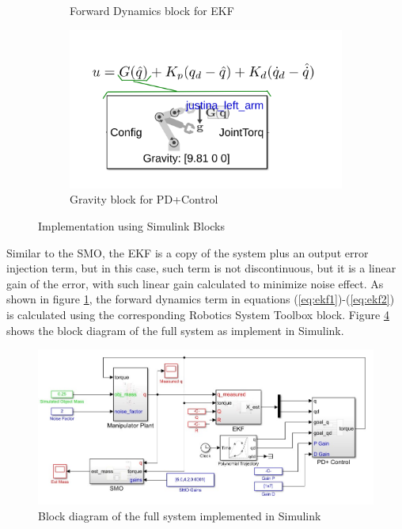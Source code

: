 \documentclass[a4paper, 10pt]{article}
\begin{document}
\begin{figure}
\begin{subfigure}{0.45\textwidth}
  \caption{Forward Dynamics block for EKF}
  \label{fig:EKFSimulink}
  \end{subfigure}
  \hfill
  \begin{subfigure}{0.45\textwidth}
  \centering
  \includegraphics[width=\textwidth]{Figures/ControlSimulink.png}
  \caption{Gravity block for PD+Control}
  \label{fig:ControlSimulink}
  \end{subfigure}
  \caption{Implementation using Simulink Blocks}
\end{figure}
  
Similar to the SMO, the EKF is a copy of the system plus an output error injection term, but in this case, such term is not discontinuous, but it is a linear gain of the error, with such linear gain calculated to minimize noise effect. As shown in figure \ref{fig:EKFSimulink}, the forward dynamics term in equations (\ref{eq:ekf1})-(\ref{eq:ekf2}) is calculated using the corresponding Robotics System Toolbox block. Figure \ref{fig:FullSystemBlocks} shows the block diagram of the full system as implement in Simulink. 

\begin{figure}[h!]
  \centering
  \includegraphics[width=\textwidth]{Figures/MassEstimatorDiagram.jpg}
  \caption{Block diagram of the full system implemented in Simulink}
  \label{fig:FullSystemBlocks}
\end{figure}
\end{document}

